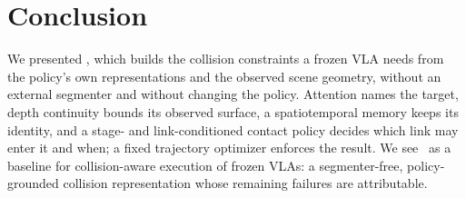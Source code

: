 \section{Conclusion}
\label{sec:conclusion}

We presented \sys, which builds the collision constraints a frozen VLA needs from the policy's own representations and the observed scene geometry, without an external segmenter and without changing the policy. Attention names the target, depth continuity bounds its observed surface, a spatiotemporal memory keeps its identity, and a stage- and link-conditioned contact policy decides which link may enter it and when; a fixed trajectory optimizer enforces the result.  We see \sys\ as a baseline for collision-aware execution of frozen VLAs: a segmenter-free, policy-grounded collision representation whose remaining failures are attributable.

